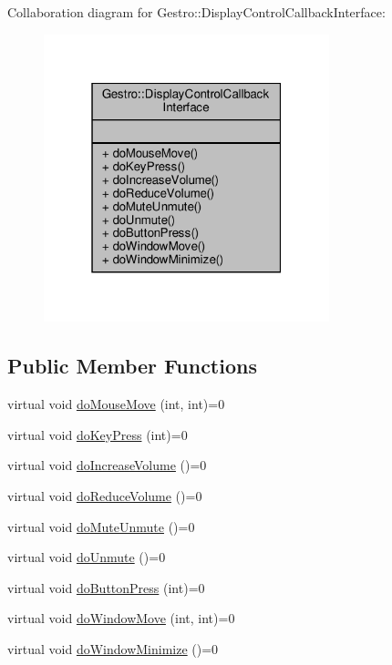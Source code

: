 Collaboration diagram for Gestro\+:\+:Display\+Control\+Callback\+Interface\+:
\nopagebreak
\begin{figure}[H]
\begin{center}
\leavevmode
\includegraphics[width=235pt]{class_gestro_1_1_display_control_callback_interface__coll__graph}
\end{center}
\end{figure}
\subsection*{Public Member Functions}
\begin{DoxyCompactItemize}
\item 
virtual void \hyperlink{class_gestro_1_1_display_control_callback_interface_a35d453c78b578d061c89c95b3ae9ee8a}{do\+Mouse\+Move} (int, int)=0
\item 
virtual void \hyperlink{class_gestro_1_1_display_control_callback_interface_aa6d1e75bb4b3aa0b0e10497576b1053f}{do\+Key\+Press} (int)=0
\item 
virtual void \hyperlink{class_gestro_1_1_display_control_callback_interface_af26f63171de9622c5723363732f590c8}{do\+Increase\+Volume} ()=0
\item 
virtual void \hyperlink{class_gestro_1_1_display_control_callback_interface_a8648fb64585379393917e6b50e348070}{do\+Reduce\+Volume} ()=0
\item 
virtual void \hyperlink{class_gestro_1_1_display_control_callback_interface_ab660632d549760b0404388fc8e86714a}{do\+Mute\+Unmute} ()=0
\item 
virtual void \hyperlink{class_gestro_1_1_display_control_callback_interface_a74ddca7b1ef399a41f6025163407bb4d}{do\+Unmute} ()=0
\item 
virtual void \hyperlink{class_gestro_1_1_display_control_callback_interface_ab661600cad2743fd41253fb9cabbee51}{do\+Button\+Press} (int)=0
\item 
virtual void \hyperlink{class_gestro_1_1_display_control_callback_interface_a5232eef7102a1db6d227189132c92ebd}{do\+Window\+Move} (int, int)=0
\item 
virtual void \hyperlink{class_gestro_1_1_display_control_callback_interface_a677aa306f08c548396a048c680bf5e10}{do\+Window\+Minimize} ()=0
\end{DoxyCompactItemize}


